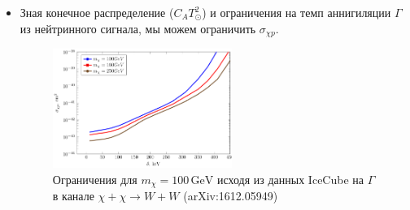 \begin{itemize}
	\item Зная конечное распределение ($C_A T_{\odot}^2$) и ограничения на темп аннигиляции  $\Gamma$ из нейтринного сигнала, мы можем ограничить $\sigma_{\chi p}$. 
	\begin{figure}[!h]
		\centering
		\includegraphics[width=0.55\textwidth]{images/Constrains.png}
		\caption{Ограничения для $m_{\chi} = 100 \, \text{GeV}$ исходя из данных IceCube  на $\Gamma$ в канале $\chi+\chi \to W + W$ (arXiv:1612.05949)} 
	\end{figure}
\end{itemize}
